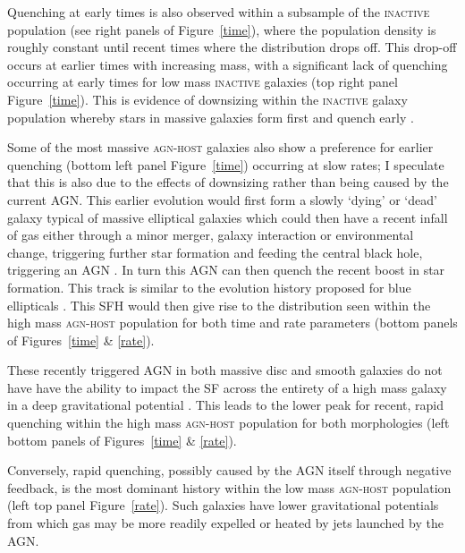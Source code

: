 Quenching at early times is also observed within a subsample of the \textsc{inactive} population (see right panels of Figure~\ref{time}), where the population density is roughly constant until recent times where the distribution drops off.  This drop-off occurs at earlier times with increasing mass, with a significant lack of quenching occurring at early times for low mass \textsc{inactive} galaxies (top right panel Figure~\ref{time}). This is evidence of downsizing within the \textsc{inactive} galaxy population whereby stars in massive galaxies form first and quench early \citep{Cowie96, Thomas10}. 

Some of the most massive \textsc{agn-host} galaxies also show a preference for earlier quenching (bottom left panel Figure~\ref{time}) occurring at slow rates; I speculate that this is also due to the effects of downsizing rather than being caused by the current AGN. This earlier evolution would first form a slowly `dying' or `dead' galaxy typical of massive elliptical galaxies which could then have a recent infall of gas either through a minor merger, galaxy interaction or environmental change, triggering further star formation and feeding the central black hole, triggering an AGN \citep{kaviraj14b}. In turn this AGN can then quench the recent boost in star formation. This track is similar to the evolution history proposed for blue ellipticals \citep[][and detected in the top panel of Figure~\ref{blue_c}]{Kaviraj13, McIntosh14, Haines15}. This SFH would then give rise to the distribution seen within the high mass \textsc{agn-host} population for both time and rate parameters (bottom panels of Figures~\ref{time} \& \ref{rate}).


These recently triggered AGN in both massive disc and smooth galaxies do not have have the ability to impact the SF across the entirety of a high mass galaxy in a deep gravitational potential \citep{ishibashi12, Zinn13}. This leads to the lower peak for recent, rapid quenching within the high mass \textsc{agn-host} population for both morphologies (left bottom panels of Figures~\ref{time} \& \ref{rate}). 

Conversely, rapid quenching, possibly caused by the AGN itself through negative feedback, is the most dominant history within the low mass \textsc{agn-host} population (left top panel Figure~\ref{rate}). Such galaxies have lower gravitational potentials from which gas may be more readily expelled or heated \citep{tortora09} by jets launched by the AGN. 

